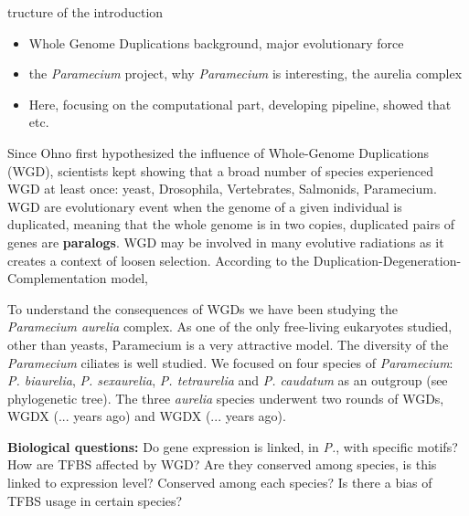 tructure of the introduction
\newline
\begin{itemize}
\item Whole Genome Duplications background, major evolutionary force
\item the \textit{Paramecium} project, why \textit{Paramecium} is interesting, the aurelia complex
\item Here, focusing on the computational part, developing pipeline, showed that etc.
\end{itemize}

Since Ohno first hypothesized the influence of Whole-Genome Duplications (WGD), scientists kept showing that a broad number of species experienced WGD at least once: yeast, Drosophila, Vertebrates, Salmonids, Paramecium. WGD are evolutionary event when the genome of a given individual is duplicated, meaning that the whole genome is in two copies, duplicated pairs of genes are \textbf{paralogs}. WGD may be involved in many evolutive radiations as it creates a context of loosen selection. According to the Duplication-Degeneration-Complementation model,

To understand the consequences of WGDs we have been studying the \textit{Paramecium aurelia} complex. As one of the only free-living eukaryotes studied, other than yeasts, Paramecium is a very attractive model. The diversity of the \textit{Paramecium} ciliates is well studied. We focused on four species of \textit{Paramecium}: \textit{P. biaurelia}, \textit{P. sexaurelia}, \textit{P. tetraurelia} and \textit{P. caudatum} as an outgroup (see phylogenetic tree). The three \textit{aurelia} species underwent two rounds of WGDs, WGDX (... years ago) and WGDX (... years ago).

\textbf{Biological questions:} Do gene expression is linked, in \textit{P.}, with specific motifs? How are TFBS affected by WGD? Are they conserved among species, is this linked to expression level? Conserved among each species? Is there a bias of TFBS usage in certain species?